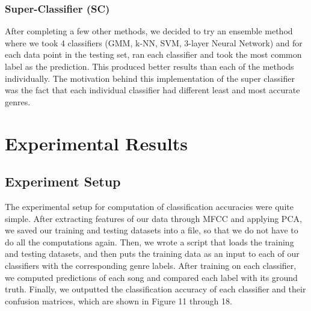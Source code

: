 \subsubsection{\textbf{Super-Classifier (SC)}}
After completing a few other methods, we decided to try an ensemble method where we took 4 classifiers (GMM, k-NN, SVM, 3-layer Neural Network) and for each data point in the testing set, ran each classifier and took the most common label as the prediction. This produced better results than each of the methods individually. The motivation behind this implementation of the super classifier was the fact that each individual classifier had different least and most accurate genres. 

\section{Experimental Results}\label{sec:results}
\subsection{Experiment Setup}
The experimental setup for computation of classification accuracies were quite simple. After extracting features of our data through MFCC and applying PCA, we saved our training and testing datasets into a file, so that we do not have to do all the computations again. Then, we wrote a script that loads the training and testing datasets, and then puts the training data as an input to each of our classifiers with the corresponding genre labels. After training on each classifier, we computed predictions of each song and compared each label with its ground truth. Finally, we outputted the classification accuracy of each classifier and their confusion matrices, which are shown in Figure 11 through 18.

